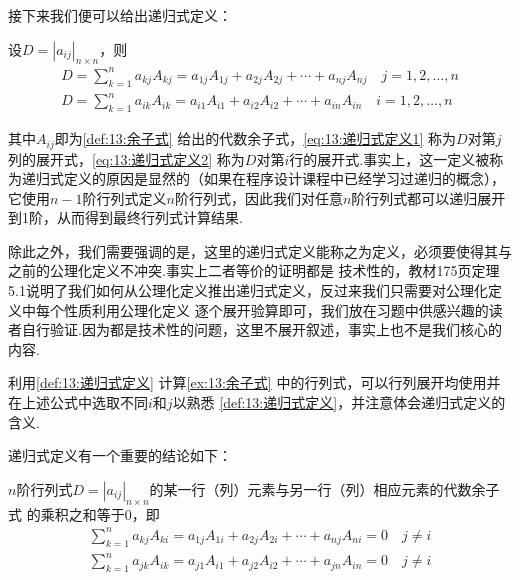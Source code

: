接下来我们便可以给出递归式定义：
\begin{definition} \label{def:13:递归式定义}
    设$D=|a_{ij}|_{n \times n}$，则
    \begin{gather}
        \label{eq:13:递归式定义1}
        D=\sum_{k=1}^{n}a_{kj}A_{kj}=a_{1j}A_{1j}+a_{2j}A_{2j}+\cdots+a_{nj}A_{nj} \quad j=1,2,\ldots,n \\
        \label{eq:13:递归式定义2}
        D=\sum_{k=1}^{n}a_{ik}A_{ik}=a_{i1}A_{i1}+a_{i2}A_{i2}+\cdots+a_{in}A_{in} \quad i=1,2,\ldots,n
    \end{gather}
\end{definition}
其中$A_{ij}$即为\autoref{def:13:余子式} 给出的代数余子式，\autoref{eq:13:递归式定义1} 称为$D$对第$j$列的展开式，\autoref{eq:13:递归式定义2}
称为$D$对第$i$行的展开式.事实上，这一定义被称为递归式定义的原因是显然的（如果在程序设计课程中已经学习过递归的概念），
它使用$n-1$阶行列式定义$n$阶行列式，因此我们对任意$n$阶行列式都可以递归展开到1阶，从而得到最终行列式计算结果.

除此之外，我们需要强调的是，这里的递归式定义能称之为定义，必须要使得其与之前的公理化定义不冲突.事实上二者等价的证明都是
技术性的，教材175页定理5.1说明了我们如何从公理化定义推出递归式定义，反过来我们只需要对公理化定义中每个性质利用公理化定义
逐个展开验算即可，我们放在习题中供感兴趣的读者自行验证.因为都是技术性的问题，这里不展开叙述，事实上也不是我们核心的内容.
\begin{example} \label{ex:13:递归式定义}
    利用\autoref{def:13:递归式定义} 计算\autoref{ex:13:余子式} 中的行列式，可以行列展开均使用并在上述公式中选取不同$i$和$j$以熟悉
    \autoref{def:13:递归式定义}，并注意体会递归式定义的含义.
\end{example}
\begin{solution}

\end{solution}

递归式定义有一个重要的结论如下：
\begin{theorem}
    $n$阶行列式$D=|a_{ij}|_{n \times n}$的某一行（列）元素与另一行（列）相应元素的代数余子式
    的乘积之和等于0，即
    \begin{gather}
        \label{eq:13:递归式定义3}
        \sum_{k=1}^{n}a_{kj}A_{ki}=a_{1j}A_{1i}+a_{2j}A_{2i}+\cdots+a_{nj}A_{ni}=0 \quad j \neq i \\
        \label{eq:13:递归式定义4}
        \sum_{k=1}^{n}a_{jk}A_{ik}=a_{j1}A_{i1}+a_{j2}A_{i2}+\cdots+a_{jn}A_{in}=0 \quad j \neq i
    \end{gather}
\end{theorem}

